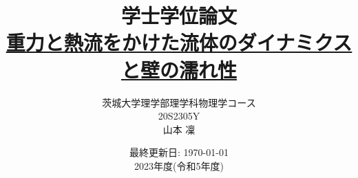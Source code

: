 \documentclass[12pt, dvipdfmx]{jsreport}
\begin{document}
\title{学士学位論文 \\ \href{https://github.com/m-agnet/Report.git}{重力と熱流をかけた流体のダイナミクスと壁の濡れ性}}
\author{茨城大学理学部理学科物理学コース \\ 20S2305Y \\ 山本 凜}
\date{最終更新日: \today \\ 2023年度(令和5年度)}
\maketitle
\newpage

\setcounter{tocdepth}{3}
\tableofcontents
\newpage

% 
% 
% 

% 
% 
% 

\appendix
% 
% 



\end{document}
